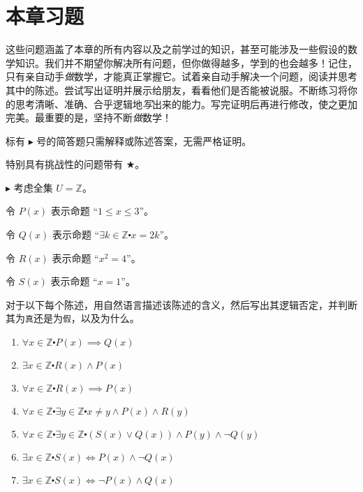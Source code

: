 \section{本章习题}

这些问题涵盖了本章的所有内容以及之前学过的知识，甚至可能涉及一些假设的数学知识。我们并不期望你解决所有问题，但你做得越多，学到的也会越多！记住，只有亲自动手\emph{做}数学，才能真正掌握它。试着亲自动手解决一个问题，阅读并思考其中的陈述。尝试写出证明并展示给朋友，看看他们是否能被说服。不断练习将你的思考清晰、准确、合乎逻辑地\emph{写}出来的能力。写完证明后再进行修改，使之更加完美。最重要的是，坚持不断\emph{做}数学！

标有 $\blacktriangleright$ 号的简答题只需解释或陈述答案，无需严格证明。

特别具有挑战性的问题带有 $\bigstar$。

\begin{exercise}
    $\blacktriangleright$ 考虑全集 $U=\mathbb{Z}$。

    令 $P(x)$ 表示命题 ``$1 \le x \le 3$''。

    令 $Q(x)$ 表示命题 ``$\exists k \in \mathbb{Z} \centerdot x=2k$''。

    令 $R(x)$ 表示命题 ``$x^2=4$''。

    令 $S(x)$ 表示命题 ``$x=1$''。

    对于以下每个陈述，用自然语言描述该陈述的含义，然后写出其逻辑否定，并判断其为\verb|真|还是为\verb|假|，以及为什么。

    \begin{enumerate}[label=(\alph*)]
        \item $\forall x \in \mathbb{Z} \centerdot P(x) \implies Q(x)$
        \item $\exists x \in \mathbb{Z} \centerdot R(x) \land P(x)$
        \item $\forall x \in \mathbb{Z} \centerdot R(x) \implies P(x)$
        \item $\forall x \in \mathbb{Z} \centerdot \exists y \in \mathbb{Z} \centerdot x \ne y \land P(x) \land R(y)$
        \item $\forall x \in \mathbb{Z} \centerdot \exists y \in \mathbb{Z} \centerdot (S(x) \lor Q(x)) \land P(y) \land \neg Q(y)$
        \item $\exists x \in \mathbb{Z} \centerdot S(x) \iff P(x) \land \neg Q(x)$
        \item $\exists x \in \mathbb{Z} \centerdot S(x) \iff \neg P(x) \land Q(x)$
    \end{enumerate}
\end{exercise}

